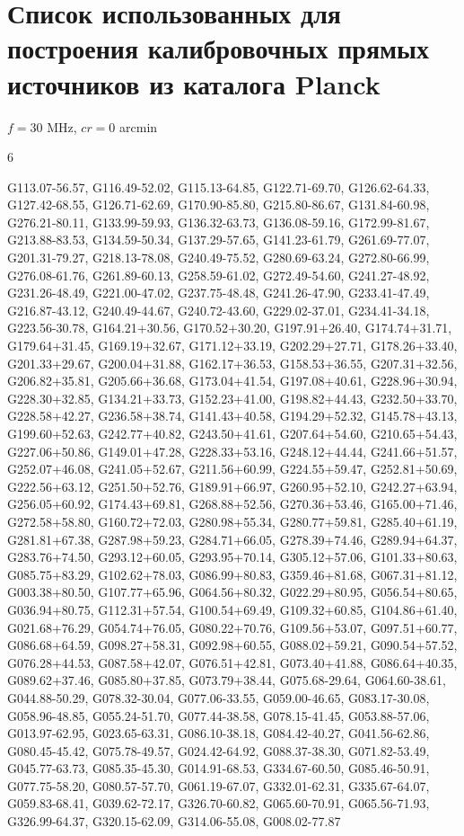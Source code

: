 \documentclass[12pt,a4paper]{article}
\newcommand{\numofcol}{6}
\begin{document}
\newpage
\section{Список использованных для построения калибровочных прямых источников из каталога Planck}

$f = 30$ MHz, $cr = 0$ arcmin 
\begin{multicols}{\numofcol}
\raggedright
\footnotesize
G113.07-56.57, G116.49-52.02, G115.13-64.85, G122.71-69.70, G126.62-64.33, G127.42-68.55, G126.71-62.69, G170.90-85.80, G215.80-86.67, G131.84-60.98, G276.21-80.11, G133.99-59.93, G136.32-63.73, G136.08-59.16, G172.99-81.67, G213.88-83.53, G134.59-50.34, G137.29-57.65, G141.23-61.79, G261.69-77.07, G201.31-79.27, G218.13-78.08, G240.49-75.52, G280.69-63.24, G272.80-66.99, G276.08-61.76, G261.89-60.13, G258.59-61.02, G272.49-54.60, G241.27-48.92, G231.26-48.49, G221.00-47.02, G237.75-48.48, G241.26-47.90, G233.41-47.49, G216.87-43.12, G240.49-44.67, G240.72-43.60, G229.02-37.01, G234.41-34.18, G223.56-30.78, G164.21+30.56, G170.52+30.20, G197.91+26.40, G174.74+31.71, G179.64+31.45, G169.19+32.67, G171.12+33.19, G202.29+27.71, G178.26+33.40, G201.33+29.67, G200.04+31.88, G162.17+36.53, G158.53+36.55, G207.31+32.56, G206.82+35.81, G205.66+36.68, G173.04+41.54, G197.08+40.61, G228.96+30.94, G228.30+32.85, G134.21+33.73, G152.23+41.00, G198.82+44.43, G232.50+33.70, G228.58+42.27, G236.58+38.74, G141.43+40.58, G194.29+52.32, G145.78+43.13, G199.60+52.63, G242.77+40.82, G243.50+41.61, G207.64+54.60, G210.65+54.43, G227.06+50.86, G149.01+47.28, G228.33+53.16, G248.12+44.44, G241.66+51.57, G252.07+46.08, G241.05+52.67, G211.56+60.99, G224.55+59.47, G252.81+50.69, G222.56+63.12, G251.50+52.76, G189.91+66.97, G260.95+52.10, G242.27+63.94, G256.05+60.92, G174.43+69.81, G268.88+52.56, G270.36+53.46, G165.00+71.46, G272.58+58.80, G160.72+72.03, G280.98+55.34, G280.77+59.81, G285.40+61.19, G281.81+67.38, G287.98+59.23, G284.71+66.05, G278.39+74.46, G289.94+64.37, G283.76+74.50, G293.12+60.05, G293.95+70.14, G305.12+57.06, G101.33+80.63, G085.75+83.29, G102.62+78.03, G086.99+80.83, G359.46+81.68, G067.31+81.12, G003.38+80.50, G107.77+65.96, G064.56+80.32, G022.29+80.95, G056.54+80.65, G036.94+80.75, G112.31+57.54, G100.54+69.49, G109.32+60.85, G104.86+61.40, G021.68+76.29, G054.74+76.05, G080.22+70.76, G109.56+53.07, G097.51+60.77, G086.68+64.59, G098.27+58.31, G092.98+60.55, G088.02+59.21, G090.54+57.52, G076.28+44.53, G087.58+42.07, G076.51+42.81, G073.40+41.88, G086.64+40.35, G089.62+37.46, G085.80+37.85, G073.79+38.44, G075.68-29.64, G064.60-38.61, G044.88-50.29, G078.32-30.04, G077.06-33.55, G059.00-46.65, G083.17-30.08, G058.96-48.85, G055.24-51.70, G077.44-38.58, G078.15-41.45, G053.88-57.06, G013.97-62.95, G023.65-63.31, G086.10-38.18, G084.42-40.27, G041.56-62.86, G080.45-45.42, G075.78-49.57, G024.42-64.92, G088.37-38.30, G071.82-53.49, G045.77-63.73, G085.35-45.30, G014.91-68.53, G334.67-60.50, G085.46-50.91, G077.75-58.20, G080.57-57.70, G061.19-67.07, G332.01-62.31, G335.67-64.07, G059.83-68.41, G039.62-72.17, G326.70-60.82, G065.60-70.91, G065.56-71.93, G326.99-64.37, G320.15-62.09, G314.06-55.08, G008.02-77.87
\end{multicols}
\end{document}
